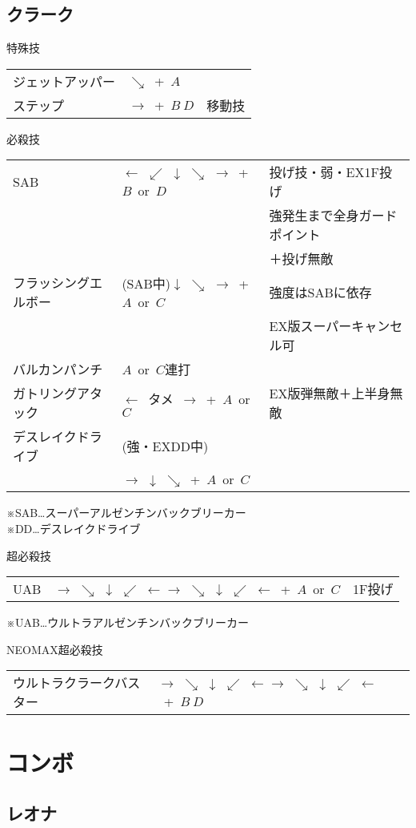 \documentclass[a4j,11pt]{jarticle}
\def\htame{$\leftarrow$\ タメ\ $\rightarrow$}
\def\hado{$\downarrow$ $\searrow$ $\rightarrow$}%
\def\syoryu{$\rightarrow$ $\downarrow$ $\searrow$}%
\def\yoga{$\leftarrow$ $\swarrow$ $\downarrow$ $\searrow$ $\rightarrow$}%
\def\gyakuyoga{$\rightarrow$ $\searrow$ $\downarrow$ $\swarrow$ $\leftarrow$}%
\begin{document}
\subsection{クラーク}
\begin{itembox}[l]{特殊技}
\begin{tabular}{lll}
ジェットアッパー&$\searrow$\ +\ $A$&\\
ステップ&$\rightarrow$\ +\ $B\ D$&移動技
\end{tabular}
\end{itembox}
\begin{itembox}[l]{必殺技}
\begin{tabular}{lll}
SAB&\yoga\ +\ $B$\ or\ $D$&投げ技・弱・EX1F投げ\\
&&強発生まで全身ガードポイント\\
&&＋投げ無敵\\
フラッシングエルボー&(SAB中)\hado\ +\ $A$\ or\ $C$&強度はSABに依存\\
&&EX版スーパーキャンセル可\\
バルカンパンチ&$A$\ or\ $C$連打&\\
ガトリングアタック&\htame\ +\ $A$\ or\ $C$&EX版弾無敵＋上半身無敵\\
デスレイクドライブ&(強・EXDD中)&\\
&\syoryu\ +\ $A$\ or\ $C$&\\
\end{tabular}
\end{itembox}
※SAB…スーパーアルゼンチンバックブリーカー\\
※DD…デスレイクドライブ\\
\begin{itembox}[l]{超必殺技}
\begin{tabular}{lll}
UAB&\gyakuyoga\gyakuyoga\ +\ $A$\ or\ $C$&1F投げ
\end{tabular}
\end{itembox}
※UAB…ウルトラアルゼンチンバックブリーカー\\
\begin{itembox}[l]{NEOMAX超必殺技}
\begin{tabular}{lll}
ウルトラクラークバスター&\gyakuyoga\gyakuyoga\ +\ $B\ D$&
\end{tabular}
\end{itembox}
\newpage
\section{コンボ}
\subsection{レオナ}
\end{document}

